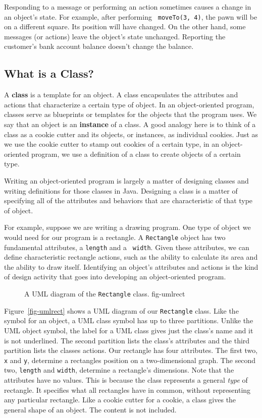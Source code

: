 Responding to a message or performing an action sometimes causes a
change in an object's state. For example, after performing {\tt
moveTo(3, 4)}, the pawn will be on a different square. Its position
will have changed. On the other hand, some messages (or actions) leave
the object's state unchanged. Reporting the customer's bank account
balance doesn't change the balance.

\subsection{What is a Class?}

A {\bf class} is a template for an object. A class encapsulates the
attributes and actions that characterize a certain type of object. In
an object-oriented program, classes serve as blueprints or templates
for the objects that the program uses. We say that an object is an
{\bf instance} of a class.  A good analogy here is to think of a class
as a cookie cutter and its objects, or instances, as individual
cookies.  Just as we use the cookie cutter to stamp out cookies of a
certain type, in an object-oriented program, we use a definition of a
class to create objects of a certain type.

Writing an object-oriented program is largely a matter of designing
classes and writing definitions for those classes in Java.  Designing
a class is a matter of specifying all of the attributes and behaviors
that are characteristic of that type of object.

For example, suppose we are writing a drawing program. One type of
object we would need for our program is a rectangle. A {\tt Rectangle}
object has two fundamental attributes, a {\tt length} and a {\tt
width}.  Given these attributes, we can define characteristic
rectangle actions, such as the ability to calculate its area and the
ability to draw itself. Identifying an object's attributes and actions
is the kind of design activity that goes into developing an object-oriented
program.

\begin{figure}[tb]
{A UML diagram of the {\tt Rectangle} class.
} {fig-umlrect}

\end{figure}

Figure~\ref{fig-umlrect} shows a UML diagram of our {\tt Rectangle}
class. Like the symbol for an object, a UML class symbol has up to
three partitions. Unlike the UML object symbol, the label for a
UML class gives just the class's name and it is not underlined. The
second partition lists the class's attributes and the third partition
lists the classes actions. Our rectangle has four attributes. The
first two, {\tt x} and {\tt y}, determine a rectangles position on a
two-dimensional graph. The second two, {\tt length} and {\tt width},
determine a rectangle's dimensions.  Note that the attributes have no
values. This is because the class represents a general {\em type} of
rectangle. It specifies what all rectangles have in common, without
representing any particular rectangle.  Like a cookie cutter for a
cookie, a class gives the general shape of an object. The content is
not included.

